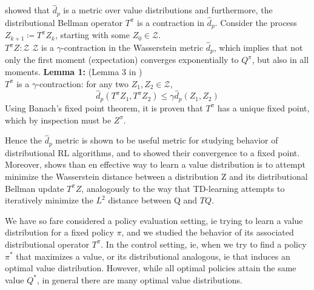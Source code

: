 \cite{Bellemare2017} showed that $\hat{d}_p$ is a metric over value distributions
and furthermore, the distributional
Bellman operator $T^\pi$ is a contraction in $\hat{d}_p$.
Consider the process $Z_{k+1} \coloneqq T^\pi Z_{k}$, starting with some $Z_{0} \in \mathcal{Z}$. \\
$T^\pi Z: \mathcal{Z} $ \ra $\mathcal{Z}$ is a $\gamma$-contraction in the Wasserstein
metric $\hat{d}_p$, which implies that 
not only the first moment (expectation) converges exponentially to $ Q^\pi$, but also in
 all moments.\newline
\textbf{Lemma 1:} (Lemma 3 in \cite{Bellemare2017} )\\
$T^\pi$ is a $\gamma$-contraction: for any two $Z_1, Z_2 \in \mathcal{Z}$,
\begin{equation}
    \hat{d}_p(T^\pi Z_1, T^\pi Z_2) \leq \gamma \hat{d}_p(Z_1,Z_2)
\end{equation}
Using Banach's fixed point theorem, it is proven that $T^\pi$ has a unique fixed point,
which by inspection must be $Z^\pi$.

Hence the $\hat{d}_p$ metric is shown to be useful metric for studying behavior of
distributional RL algorithms, and to showed their convergence to a fixed point.
Moreover, shows than en effective way to learn a value distribution is to attempt minimize
the Wasserstein distance between a distribution Z and its distributional Bellman update
$T^\pi Z$, analogously to the way that TD-learning attempts to iteratively minimize
the $L^2$ distance between Q and $TQ$.

We have so fare considered a policy evaluation setting, ie trying to learn a value
distribution for a fixed policy $\pi $, and we studied
the behavior of its associated distributional operator $T^\pi $.
In the control setting, ie, when we try to find a policy $\pi^{*} $ that maximizes a
value, or its distributional analogous, ie that
induces an optimal value distribution. However, while all optimal policies attain the
same value $Q^{*}$, in general there are
many optimal value distributions.

